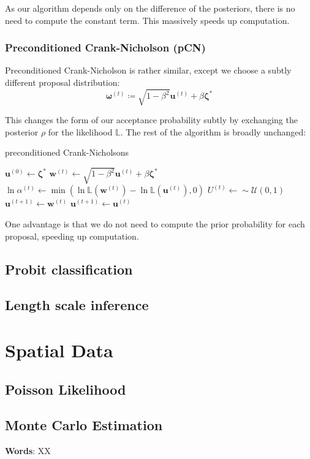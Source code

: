 \documentclass[]{article}
\newcommand{\lik}{\mathbb{L}}
\newcommand{\ubold}{\boldsymbol{u}}
\newcommand{\wbold}{\boldsymbol{w}}
\newcommand{\zetabold}{\boldsymbol{\zeta^*}}
\newcommand{\omegabold}{\boldsymbol{\omega}}
\begin{document}
As our algorithm depends only on the difference of the posteriors, there is no need to compute the constant term. This massively speeds up computation.

\subsubsection{Preconditioned Crank-Nicholson (pCN)}

Preconditioned Crank-Nicholson is rather similar, except we choose a subtly different proposal distribution:
%
\begin{equation}
	\omegabold^{(t)} \coloneqq \sqrt{1 - \beta^2} \ubold^{(t)} + \beta \zetabold
\end{equation}

This changes the form of our acceptance probability subtly by exchanging the posterior $\rho$ for the likelihood $\lik$. The rest of the algorithm is broadly unchanged:
%
\begin{algorithm}
	\caption{preconditioned Crank-Nicholsons}
	\label{alg:pCN}
	\begin{algorithmic}
		\State $\ubold^{(0)} \gets \zetabold$
		\State $\wbold^{(t)} \gets \sqrt{1 - \beta^2} \ubold^{(t)} + \beta \zetabold$ 
		\State $\ln \alpha^{(t)} \gets \min \left(\ln \lik(\wbold^{(t)}) - \ln \lik(\ubold^{(t)}), 0\right)$
		\State $U^{(t)} \gets \sim \mathcal{U}(0,1)$ \\
		\State $\ubold^{(t+1)} \gets \wbold^{(t)}$ 
		\Else
		\State $\ubold^{(t+1)} \gets \ubold^{(t)}$ 
		\EndIf
		\EndFor
	\end{algorithmic}
\end{algorithm}

One advantage is that we do not need to compute the prior probability for each proposal, speeding up computation.

\subsection{Probit classification}

\subsection{Length scale inference}

\section{Spatial Data}

\subsection{Poisson Likelihood}

\subsection{Monte Carlo Estimation}

\textbf{Words}: XX
\end{document}
